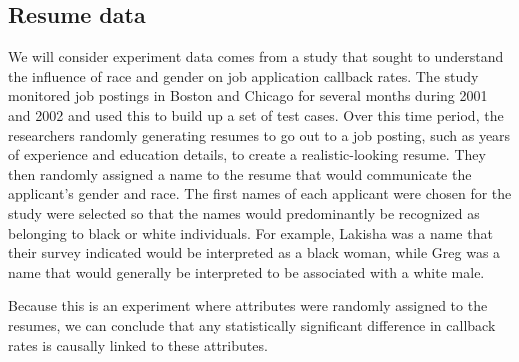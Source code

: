 
\subsection{Resume data}


\newcommand{\resNumPred}{9}
\newcommand{\resUniqueNames}{36}
\newcommand{\resHonorsInt}{-2.4998}
\newcommand{\resHonorsCoef}{0.8668}
\newcommand{\resHonorsIntPlusCoef}{-1.6330}
\newcommand{\resHonorsCoefSE}{0.1776}
\newcommand{\resHonorsCoefZ}{4.88}
\newcommand{\resHonorsProb}{0.163}
\newcommand{\resHonorsPerc}{16.3\%}
\newcommand{\resHonorsNotProb}{0.076}
\newcommand{\resHonorsNotPerc}{7.6\%}

We will consider experiment data comes from a study that sought
to understand the influence of race and gender on job application
callback rates.
The study monitored job postings in Boston and Chicago for
several months during 2001 and 2002 and used this to build
up a set of test cases.
Over this time period, the researchers randomly generating
resumes to go out to a job posting, such as years of experience
and education details, to create a realistic-looking resume.
They then randomly assigned a name to the resume that would
communicate the applicant's gender and race.
The first names of each applicant were chosen for the study
were selected so that the names would predominantly be
recognized as belonging to black or white individuals.
For example, Lakisha was a name that their survey indicated
would be interpreted as a black woman, while Greg was a name
that would generally be interpreted to be associated with
a white male.

Because this is an experiment where attributes were
randomly assigned to the resumes, we can conclude that
any statistically significant difference in callback
rates is causally linked to these attributes.

